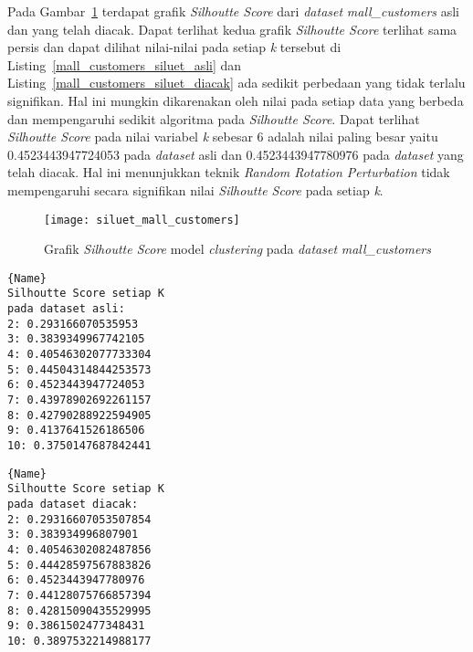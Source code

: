 Pada Gambar~\ref{fig:siluet_mall_customers} terdapat grafik \textit{Silhoutte Score} dari \textit{dataset} \textit{mall\_customers} asli dan yang telah diacak. Dapat terlihat kedua grafik \textit{Silhoutte Score} terlihat sama persis dan dapat dilihat nilai-nilai pada setiap \textit{k} tersebut di Listing~\ref{mall_customers_siluet_asli} dan Listing~\ref{mall_customers_siluet_diacak} ada sedikit perbedaan yang tidak terlalu signifikan. Hal ini mungkin dikarenakan oleh nilai pada setiap data yang berbeda dan mempengaruhi sedikit algoritma pada \textit{Silhoutte Score}. Dapat terlihat \textit{Silhoutte Score} pada nilai variabel \textit{k} sebesar 6 adalah nilai paling besar yaitu 0.4523443947724053 pada \textit{dataset} asli dan 0.4523443947780976 pada \textit{dataset} yang telah diacak. Hal ini menunjukkan teknik \textit{Random Rotation Perturbation} tidak mempengaruhi secara signifikan nilai \textit{Silhoutte Score} pada setiap \textit{k}.

\begin{figure}
	\centering
	\texttt{[image: siluet\_mall\_customers]}
	\caption{Grafik \textit{Silhoutte Score} model \textit{clustering} pada \textit{dataset} \textit{mall\_customers}}
	\label{fig:siluet_mall_customers}
\end{figure}
	
\noindent\begin{minipage}{.48\textwidth}
\begin{lstlisting}[caption=\textit{Dataset mall\_customers} Asli,frame=tlrb, label=mall_customers_siluet_asli]{Name}
Silhoutte Score setiap K
pada dataset asli: 
2: 0.293166070535953
3: 0.3839349967742105
4: 0.40546302077733304
5: 0.44504314844253573
6: 0.4523443947724053
7: 0.43978902692261157
8: 0.42790288922594905
9: 0.4137641526186506
10: 0.3750147687842441
\end{lstlisting}
\end{minipage}\hfill
\begin{minipage}{.48\textwidth}
\begin{lstlisting}[caption=\textit{Dataset mall\_customers} Diacak,frame=tlrb, label=mall_customers_siluet_diacak]{Name}
Silhoutte Score setiap K
pada dataset diacak: 
2: 0.29316607053507854
3: 0.383934996807901
4: 0.40546302082487856
5: 0.44428597567883826
6: 0.4523443947780976
7: 0.44128075766857394
8: 0.42815090435529995
9: 0.3861502477348431
10: 0.3897532214988177
\end{lstlisting}
\end{minipage}


